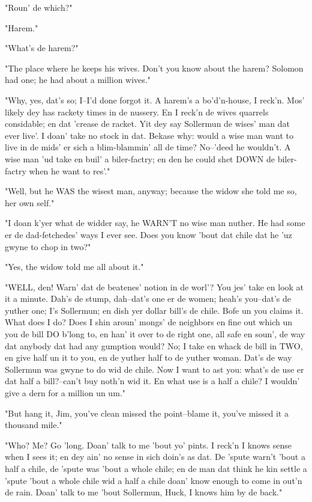 "Roun' de which?"

"Harem."

"What's de harem?"

"The place where he keeps his wives.  Don't you know about the harem?
Solomon had one; he had about a million wives."

"Why, yes, dat's so; I--I'd done forgot it.  A harem's a bo'd'n-house, I
reck'n.  Mos' likely dey has rackety times in de nussery.  En I reck'n de
wives quarrels considable; en dat 'crease de racket.  Yit dey say
Sollermun de wises' man dat ever live'.  I doan' take no stock in dat.
Bekase why: would a wise man want to live in de mids' er sich a
blim-blammin' all de time?  No--'deed he wouldn't.  A wise man 'ud take
en buil' a biler-factry; en den he could shet DOWN de biler-factry when
he want to res'."

"Well, but he WAS the wisest man, anyway; because the widow she told me
so, her own self."

"I doan k'yer what de widder say, he WARN'T no wise man nuther.  He had
some er de dad-fetchedes' ways I ever see.  Does you know 'bout dat chile
dat he 'uz gwyne to chop in two?"

"Yes, the widow told me all about it."

"WELL, den!  Warn' dat de beatenes' notion in de worl'?  You jes' take en
look at it a minute.  Dah's de stump, dah--dat's one er de women; heah's
you--dat's de yuther one; I's Sollermun; en dish yer dollar bill's de
chile.  Bofe un you claims it.  What does I do?  Does I shin aroun'
mongs' de neighbors en fine out which un you de bill DO b'long to, en
han' it over to de right one, all safe en soun', de way dat anybody dat
had any gumption would?  No; I take en whack de bill in TWO, en give half
un it to you, en de yuther half to de yuther woman.  Dat's de way
Sollermun was gwyne to do wid de chile.  Now I want to ast you:  what's
de use er dat half a bill?--can't buy noth'n wid it.  En what use is a
half a chile?  I wouldn' give a dern for a million un um."

"But hang it, Jim, you've clean missed the point--blame it, you've missed
it a thousand mile."

"Who?  Me?  Go 'long.  Doan' talk to me 'bout yo' pints.  I reck'n I
knows sense when I sees it; en dey ain' no sense in sich doin's as dat.
De 'spute warn't 'bout a half a chile, de 'spute was 'bout a whole chile;
en de man dat think he kin settle a 'spute 'bout a whole chile wid a half
a chile doan' know enough to come in out'n de rain.  Doan' talk to me
'bout Sollermun, Huck, I knows him by de back."

